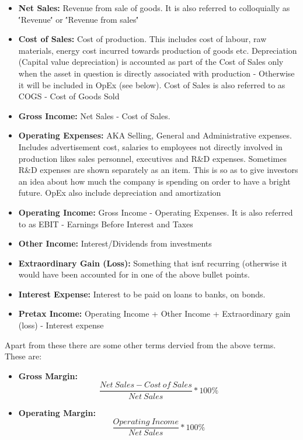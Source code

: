 \begin{itemize}
	\item \textbf{Net Sales:} Revenue from sale of goods. It is also referred to colloquially as \''Revenue\'' or \''Revenue from sales\''
	\item \textbf{Cost of Sales:} Cost of production. This includes cost of labour, raw materials, energy cost incurred towards production of goods etc. Depreciation (Capital value depreciation) is accounted as part of the Cost of Sales only when the asset in question is directly associated with production - Otherwise it will be included in OpEx (see below). Cost of Sales is also referred to as COGS - Cost of Goods Sold
	\item \textbf{Gross Income:} Net Sales - Cost of Sales. 
	\item \textbf{Operating Expenses:} AKA Selling, General and Administrative expenses. Includes advertisement cost, salaries to employees not directly involved in production likes sales personnel, executives and R\&D expenses. Sometimes R\&D expenses are shown separately as an item. This is so as to give investors an idea about how much the company is spending on order to have a bright future. OpEx also include depreciation and amortization 
	\item \textbf{Operating Income:} Gross Income - Operating Expenses. It is also referred to as EBIT - Earnings Before Interest and Taxes
	\item \textbf{Other Income:} Interest/Dividends from investments
	\item \textbf{Extraordinary Gain (Loss):} Something that isn\'t recurring (otherwise it would have been accounted for in one of the above bullet points.
	\item \textbf{Interest Expense:} Interest to be paid on loans to banks, on bonds.
	\item \textbf{Pretax Income:} Operating Income + Other Income + Extraordinary gain (loss) - Interest expense
\end{itemize}

Apart from these there are some other terms dervied from the above terms. These are:
\begin{itemize}
\item\textbf{Gross Margin:} $$ \frac{Net\: Sales - Cost\: of\: Sales}{Net\: Sales} * 100\%$$
\item\textbf{Operating Margin:} $$\frac{Operating\: Income}{Net\: Sales}*100\%$$
\end{itemize}

